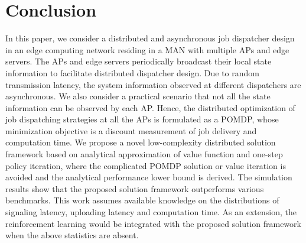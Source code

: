 \section{Conclusion}
\label{sec:conclusion}
In this paper, we consider a distributed and asynchronous job dispatcher design in an edge computing network residing in a MAN with multiple APs and edge servers.
The APs and edge servers periodically broadcast their local state information to facilitate distributed dispatcher design.
Due to random transmission latency, the system information observed at different dispatchers are asynchronous.
We also consider a practical scenario that not all the state information can be observed by each AP.
Hence, the distributed optimization of job dispatching strategies at all the APs is formulated as a POMDP, whose minimization objective is a discount measurement of job delivery and computation time.
We propose a novel low-complexity distributed solution framework based on analytical approximation of value function and one-step policy iteration, where the complicated POMDP solution or value iteration is avoided and the analytical performance lower bound is derived.
The simulation results show that the proposed solution framework outperforms various benchmarks.
This work assumes available knowledge on the distributions of signaling latency, uploading latency and computation time.
As an extension, the reinforcement learning would be integrated with the proposed solution framework when the above statistics are absent.